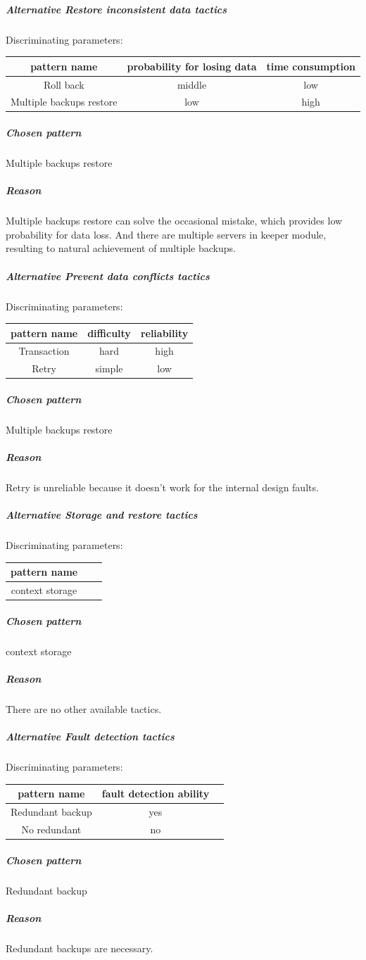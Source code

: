 \documentclass{article}
\begin{document}
		\subparagraph{Alternative Restore inconsistent data tactics}
		Discriminating parameters:\\
		\begin{center}
			\begin{tabular}{|c|c|c|}
				\hline
				pattern name & probability for losing data & time consumption\\
				\hline
				Roll back& middle & low\\
				\hline
				Multiple backups restore & low& high\\
				\hline
			\end{tabular}
		\end{center}
		\subparagraph{Chosen pattern} 
		Multiple backups restore
		\subparagraph{Reason} 
		Multiple backups restore can solve the occasional mistake, which provides low probability for data loss. And there are multiple servers in keeper module, resulting to natural achievement of multiple backups.

		\subparagraph{Alternative Prevent data conflicts tactics}
		Discriminating parameters:\\
		\begin{center}
			\begin{tabular}{|c|c|c|}
				\hline
				pattern name & difficulty & reliability\\
				\hline
				Transaction & hard & high\\
				\hline
				Retry & simple & low\\
				\hline
			\end{tabular}
		\end{center}
		\subparagraph{Chosen pattern} 
		Multiple backups restore
		\subparagraph{Reason} 
		Retry is unreliable because it doesn't work for the internal design faults.

		\subparagraph{Alternative Storage and restore tactics}
		Discriminating parameters:\\
		\begin{center}
			\begin{tabular}{|c|c|c|}
				\hline
				pattern name\\
				\hline
				context storage\\
				\hline
			\end{tabular}
		\end{center}
		\subparagraph{Chosen pattern} 
		context storage
		\subparagraph{Reason} 
		There are no other available tactics.

		\subparagraph{Alternative Fault detection tactics}
		Discriminating parameters:\\
		\begin{center}
			\begin{tabular}{|c|c|c|}
				\hline
				pattern name & fault detection ability\\
				\hline
				Redundant backup & yes\\
				\hline
				No redundant& no\\
				\hline
			\end{tabular}
		\end{center}
		\subparagraph{Chosen pattern} 
		Redundant backup
		\subparagraph{Reason} 
		Redundant backups are necessary.
\end{document}
